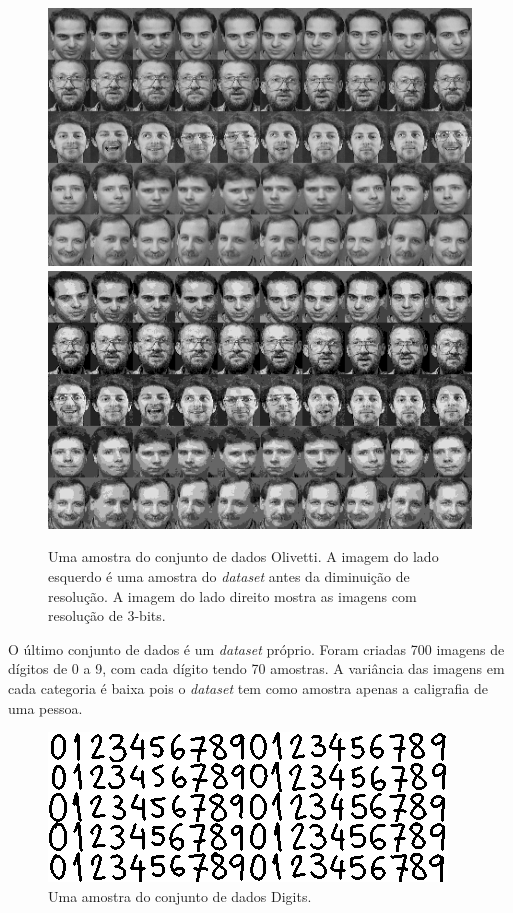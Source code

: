\documentclass[12pt]{article}
\theoremstyle{plain}
\numberwithin{equation}{section}
\begin{document}
\begin{figure}[h]
  \centering\includegraphics[scale=0.5]{imgs/olivetti_sample.png}
  \includegraphics[scale=0.5]{imgs/olivetti-8_sample.png}
  \captionsetup{justification=raggedright}
  \caption{Uma amostra do conjunto de dados Olivetti. A imagem do lado esquerdo é uma amostra do
  \textit{dataset} antes da diminuição de resolução. A imagem do lado direito mostra as imagens com
  resolução de 3-bits.}
\end{figure}

O último conjunto de dados é um \textit{dataset} próprio. Foram criadas 700 imagens de dígitos de 0
a 9, com cada dígito tendo 70 amostras. A variância das imagens em cada categoria é baixa pois o
\textit{dataset} tem como amostra apenas a caligrafia de uma pessoa.

\begin{figure}[h]
  \centering\includegraphics[scale=0.8]{imgs/digits_sample.png}
  \caption{Uma amostra do conjunto de dados Digits.}
\end{figure}
\end{document}
